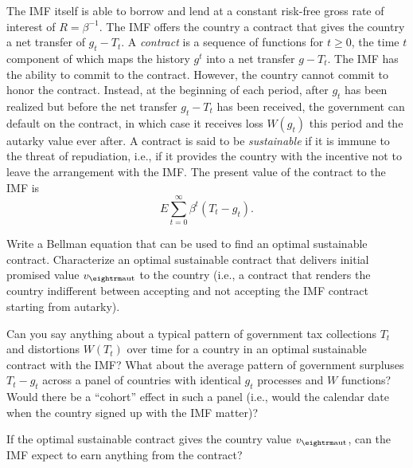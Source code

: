The IMF itself is able to borrow and lend at a constant risk-free
gross rate of interest of $R = \beta^{-1}$.  The IMF offers the
country a contract that gives the country a net transfer of $g_t -
T_t$. A {\it contract\/} is a sequence of functions for $t\geq 0$,
the time $t$ component of which maps the history $g^t$ into a net
transfer $g-T_t$. The IMF has the ability to commit to the
contract. However, the country cannot commit to honor the
contract. Instead, at the beginning of each period, after $g_t$
has been realized but before the net transfer $g_t-T_t$ has been
received, the government can default on the contract, in which
case it receives loss $W(g_t)$ this period and the autarky value
ever after.  A contract is said to be {\it sustainable\/} if it is
immune to the threat of repudiation, i.e., if it  provides the
country with the incentive not to leave the arrangement with the
IMF.  The present value of the contract to the IMF is
$$ E \sum_{t=0}^\infty \beta^t (T_t - g_t)   .$$

\medskip
{}  Write a Bellman equation that can be used to
find an optimal sustainable contract.
\medskip
{}  Characterize an optimal  sustainable contract
that delivers initial promised value $v_{\rm aut}$ to the country
(i.e., a contract that renders the country indifferent between
accepting and not accepting the IMF contract starting from
autarky).

\medskip
{}  Can you say anything about a typical pattern of
government tax collections $T_t$  and distortions $W(T_t)$ over
time for a country in an optimal sustainable contract with the
IMF? What about the average pattern of government surpluses
$T_t-g_t$ across a panel of countries with identical $g_t$
processes and $W$ functions?  Would there be a ``cohort'' effect in
such a panel (i.e., would the calendar date when the country
signed up with the IMF matter)?

\medskip

 If the optimal sustainable contract gives the
country value $v_{\rm aut}$, can the IMF expect to earn anything
from the contract?




